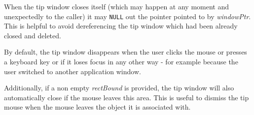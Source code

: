 When the tip window closes itself (which may happen at any moment and
unexpectedly to the caller) it may {\tt NULL} out the pointer pointed to by 
{\it windowPtr}. This is helpful to avoid dereferencing the tip window which
had been already closed and deleted.


\label{wxtipwindowsetboundingrect}


By default, the tip window disappears when the user clicks the mouse or presses
a keyboard key or if it loses focus in any other way - for example because the
user switched to another application window.

Additionally, if a non empty {\it rectBound} is provided, the tip window will
also automatically close if the mouse leaves this area. This is useful to
dismiss the tip mouse when the mouse leaves the object it is associated with.



